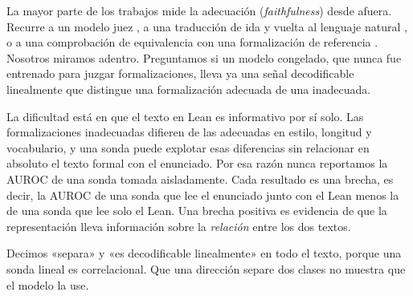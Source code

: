 \documentclass[10pt]{article}
\begin{document}
La mayor parte de los trabajos mide la adecuación (\emph{faithfulness}) desde afuera. Recurre a un modelo juez
\citep{criticlean,formalalign,zhang2026beyondcompilation,wang2026formalrx}, a una traducción de ida y vuelta al
lenguaje natural \citep{amrollahi2026roundtrip}, o a una comprobación de equivalencia con una formalización de
referencia \citep{proofnetverif,mohammad2026faithfulnessgap}. Nosotros miramos adentro. Preguntamos si un modelo
congelado, que nunca fue entrenado para juzgar formalizaciones, lleva ya una señal decodificable linealmente que
distingue una formalización adecuada de una inadecuada.

La dificultad está en que el texto en Lean es informativo por sí solo. Las formalizaciones inadecuadas difieren de
las adecuadas en estilo, longitud y vocabulario, y una sonda puede explotar esas diferencias sin relacionar en
absoluto el texto formal con el enunciado. Por esa razón nunca reportamos la AUROC de una sonda tomada aisladamente.
Cada resultado es una brecha, es decir, la AUROC de una sonda que lee el enunciado junto con el Lean menos la de
una sonda que lee solo el Lean. Una brecha positiva es evidencia de que la representación lleva información sobre la
\emph{relación} entre los dos textos.

Decimos «separa» y «es decodificable linealmente» en todo el texto, porque una sonda lineal es correlacional. Que
una dirección separe dos clases no muestra que el modelo la use.
\end{document}

